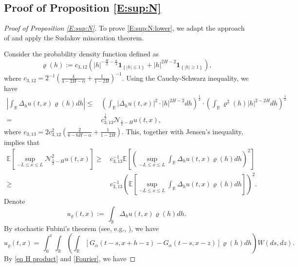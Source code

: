 \documentclass[11pt,reqno]{amsart}
\numberwithin{equation}{section}
\def\RR{\mathbb{R}}
\newcommand{\1}{{\bf 1}}
\newcommand{\2}{{\bf 2}}
\begin{document}
\subsection{Proof of  Proposition \ref{E:sup:N}}
 \begin{proof}[Proof of  Proposition \ref{E:sup:N}]
To prove \eqref{E:sup:N:lower}, we adapt the approach of \cite[Proposition 3.11]{HW2022} and apply the Sudakov minoration theorem.

Consider the   probability density function defined as 
$$
\varrho(h):=c_{3,12}\left(
|h|^{-\frac{H}2-\frac{\alpha}4} {\mathbf 1}_{\left\{|h|\leq1\right\}}+|h|^{2H-2}{\mathbf 1}_{\left\{|h|\geq1\right\}}\right),
$$
where $c_{3,12}=2^{-1}\left(\frac4{4-2H-\alpha}+\frac1{1-2H}\right)^{-1}$.
Using  the Cauchy-Schwarz inequality, we have
\begin{equation}\label{cauchy}
\begin{split}
\left|\int_{\RR} \Delta_h u(t,x) \varrho(h)dh\right|
\leq &\,
\left( \int_{\RR} |\Delta_h u(t,x)|^2\cdot |h|^{2H-2}dh\right)^{\frac12}\cdot
\left( \int_{\RR} \varrho^2(h)|h|^{2-2H} dh\right)^{\frac12}\\
=&\, c_{3,13}^{\frac12} \mathcal N_{\frac12-H}u(t,x),
\end{split}
\end{equation}
where $c_{3,13}=2c_{3,12}^2\left(\frac2{6-6H-\alpha}+\frac1{1-2H}\right)$.
This, together with Jensen's inequality, implies that
\begin{equation}\label{N:lower}
\begin{split}
\mathbb E\left[\sup_{-L\leq x \leq L}\mathcal N^2_{\frac12-H}u(t,x)\right]
\geq &\,
c_{3,13}^{-1}\mathbb E\left[ \left( \sup_{-L\leq x \leq L}\int_{\RR} \Delta_h u(t,x) \varrho(h)dh\right)^2\right]\\
\geq &\,
c_{3,13}^{-1}\left( \mathbb E\left[ \sup_{-L\leq x \leq L}\int_{\RR}\Delta_h u(t,x)\varrho(h)dh\right]\right)^2.
\end{split}
\end{equation}
Denote
\begin{equation*}
u_{\varrho}(t,x):= \, \int_{\RR} \Delta_h u(t,x) \varrho(h)dh.
\end{equation*}
By stochastic Fubini's theorem (see, e.g., \cite[Corollary 2.9]{K14}), we have 
\begin{equation*}
u_{\varrho}(t,x)=  \, \int_0^t\int_{\RR}\left( \int_{\RR} [G_\alpha(t-s,x+h-z)-G_\alpha(t-s,x-z)]\varrho(h)dh\right)W(ds,dz).
\end{equation*} 
By  \eqref{eq H product} and  \eqref{Fourier}, we have

\end{proof}
\end{document}
